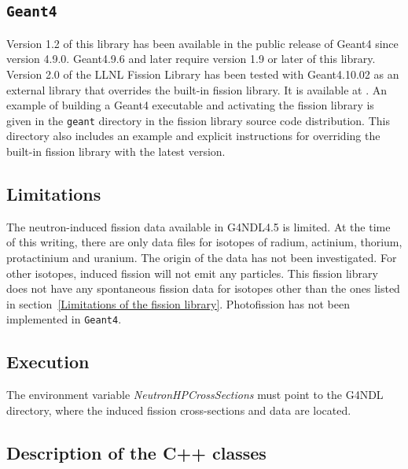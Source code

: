 \pagebreak
\subsection{{\tt Geant4}}\label{sec:geant4}

Version 1.2 of this library has been available in the public release of Geant4 since version 4.9.0. 
Geant4.9.6 and later require version 1.9 or later of this library. Version 2.0 of the LLNL Fission Library has been tested with Geant4.10.02 as an external library that overrides the built-in fission library. It is available at \httpnuclear  . 
An example of building a Geant4 executable and activating the fission library is given in the \texttt{geant} directory 
in the fission library source code distribution. This directory also includes an example and explicit instructions for overriding the built-in fission library with the latest version.

\subsection*{Limitations}

The neutron-induced fission data available in G4NDL4.5 is limited. At the time of this writing, there are only data files for  isotopes of radium, actinium, thorium, protactinium and uranium. The origin of the data has not been investigated. For other isotopes, induced fission will not emit any particles. This fission library does not have any spontaneous fission data for isotopes other than the ones listed in section~\ref{Limitations of the fission library}.
Photofission has not been implemented in {\tt Geant4}.

\subsection*{Execution}

The environment variable \textit{NeutronHPCrossSections} must point to the G4NDL directory, where the induced fission cross-sections and data are located.

\subsection*{Description of the C++ classes}



